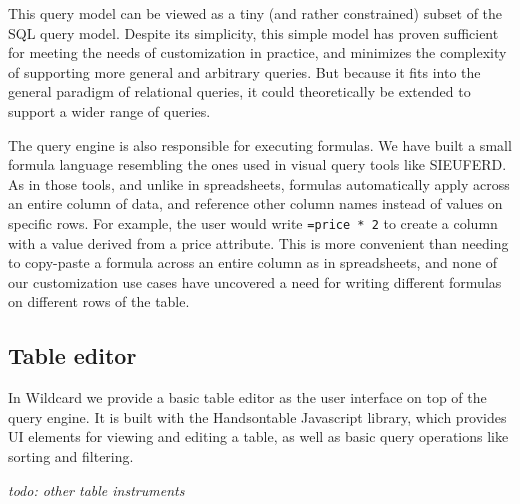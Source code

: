 \documentclass[sigplan,10pt,anonymous,review]{acmart}
\begin{document}
This query model can be viewed as a tiny (and rather constrained) subset
of the SQL query model. Despite its simplicity, this simple model has
proven sufficient for meeting the needs of customization in practice,
and minimizes the complexity of supporting more general and arbitrary
queries. But because it fits into the general paradigm of relational
queries, it could theoretically be extended to support a wider range of
queries.

The query engine is also responsible for executing formulas. We have
built a small formula language resembling the ones used in visual query
tools like SIEUFERD. As in those tools, and unlike in spreadsheets,
formulas automatically apply across an entire column of data, and
reference other column names instead of values on specific rows. For
example, the user would write \texttt{=price\ *\ 2} to create a column
with a value derived from a price attribute. This is more convenient
than needing to copy-paste a formula across an entire column as in
spreadsheets, and none of our customization use cases have uncovered a
need for writing different formulas on different rows of the table.

\hypertarget{table-editor}{%
\subsection{Table editor}\label{table-editor}}

In Wildcard we provide a basic table editor as the user interface on top
of the query engine. It is built with the Handsontable Javascript
library, which provides UI elements for viewing and editing a table, as
well as basic query operations like sorting and filtering.

\emph{todo: other table instruments}
\end{document}
